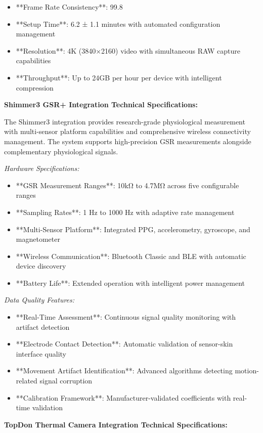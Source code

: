 \documentclass[12pt,a4paper]{article}
\begin{document}
\begin{itemize}
\item **Frame Rate Consistency**: 99.8%
\item **Setup Time**: 6.2 ± 1.1 minutes with automated configuration management
\item **Resolution**: 4K (3840×2160) video with simultaneous RAW capture capabilities
\item **Throughput**: Up to 24GB per hour per device with intelligent compression

\end{itemize}
\textbf{Shimmer3 GSR+ Integration Technical Specifications:}

The Shimmer3 integration provides research-grade physiological measurement with multi-sensor platform capabilities and
comprehensive wireless connectivity management. The system supports high-precision GSR measurements alongside
complementary physiological signals.

\textit{Hardware Specifications:}

\begin{itemize}
\item **GSR Measurement Ranges**: 10kΩ to 4.7MΩ across five configurable ranges
\item **Sampling Rates**: 1 Hz to 1000 Hz with adaptive rate management
\item **Multi-Sensor Platform**: Integrated PPG, accelerometry, gyroscope, and magnetometer
\item **Wireless Communication**: Bluetooth Classic and BLE with automatic device discovery
\item **Battery Life**: Extended operation with intelligent power management

\end{itemize}
\textit{Data Quality Features:}

\begin{itemize}
\item **Real-Time Assessment**: Continuous signal quality monitoring with artifact detection
\item **Electrode Contact Detection**: Automatic validation of sensor-skin interface quality
\item **Movement Artifact Identification**: Advanced algorithms detecting motion-related signal corruption
\item **Calibration Framework**: Manufacturer-validated coefficients with real-time validation

\end{itemize}
\textbf{TopDon Thermal Camera Integration Technical Specifications:}
\end{document}

